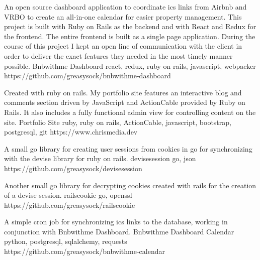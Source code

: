 \documentclass[]{awesome-cv}
\begin{document}
\vspace{-7mm}
\begin{cventries}
	\cventry
	{An open source dashboard application to coordinate ics links from Airbnb and VRBO to create an all-in-one calendar for easier property management. This project is built with Ruby on Rails as the backend and with React and Redux for the frontend. The entire frontend is built as a single page application. During the course of this project I kept an open line of communication with the client in order to deliver the exact features they needed in the most timely manner possible.}
	{Bnbwithme Dashboard}
	{react, redux, ruby on rails, javascript, webpacker}
	{https://github.com/greasysock/bnbwithme-dashboard}
	{}
	
	\vspace{-5mm}
	\cventry
	{Created with ruby on rails. My portfolio site features an interactive blog and comments section driven by JavaScript and ActionCable provided by Ruby on Rails. It also includes a fully functional admin view for controlling content on the site.}
	{Portfolio Site}
	{ruby, ruby on rails, ActionCable, javascript, bootstrap, postgresql, git}
	{https://www.chrismedia.dev}
	{}
	
	\vspace{-5mm}
\end{cventries}

\vspace{3mm}
\begin{cventries}
	\cventry
	{A small go library for creating user sessions from cookies in go for synchronizing with the devise library for ruby on rails.}
	{devisesession}
	{go, json}
	{https://github.com/greasysock/devisesession}
	{}
	
	\vspace{-5mm}
	\cventry
	{Another small go library for decrypting cookies created with rails for the creation of a devise session.}
	{railscookie}
	{go, openssl}
	{https://github.com/greasysock/railscookie}
	{}

	\vspace{-5mm}
	\cventry
	{A simple cron job for synchronizing ics links to the database, working in conjunction with Bnbwithme Dashboard.}
	{Bnbwithme Dashboard Calendar}
	{python, postgresql, sqlalchemy, requests}
	{https://github.com/greasysock/bnbwithme-calendar}
	{}
\end{cventries}

\ 
\end{document}
